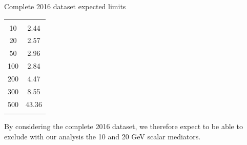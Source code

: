 \documentclass[handout,8 pt]{beamer}
\newcommand{\backupend}{
   \setcounter{framenumber}{\value{finalframe}}
}
\begin{document}
\begin{frame}{Complete 2016 dataset expected limits}
\begin{center}
\begin{minipage}[c]{.48\linewidth}
\begin{center}
\begin{tabular}{c|c}
		\hline \hline
		& \\
		10 & 2.44 \\
            	20 & 2.57  \\
            	50 & 2.96  \\
            	100 & 2.84 \\
            	200 & 4.47 \\
            	300 & 8.55 \\
            	500 & 43.36 \\
		& \\
          \end{tabular}
          \end{center}
   \end{minipage} \hfill \vfill
   \end{center}
   
   By considering the complete 2016 dataset, we therefore expect to be able to exclude with our analysis the 10 and 20 GeV scalar mediators. \vfill

\end{frame}





\backupend


 
\end{document}
